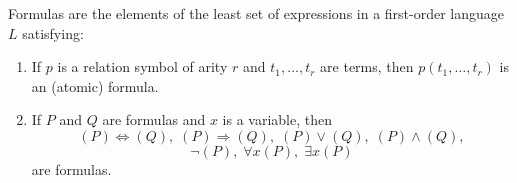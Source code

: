 Formulas are the elements of the least set of expressions in a first-order language $L$ satisfying:
\begin{enumerate}
\item[(a)] If $p$ is a relation symbol of arity $r$ and $t_1, \ldots, t_r$ are terms, then $p(t_1, \ldots, t_r)$ is an (atomic) formula.
\item[(b)] If $P$ and $Q$ are formulas and $x$ is a variable, then
$$(P) \Leftrightarrow (Q),\; (P) \Rightarrow (Q),\; (P) \vee (Q),\; (P) \wedge (Q),$$
$$\neg(P),\; \forall x(P),\; \exists x(P)$$
are formulas.
\end{enumerate}

